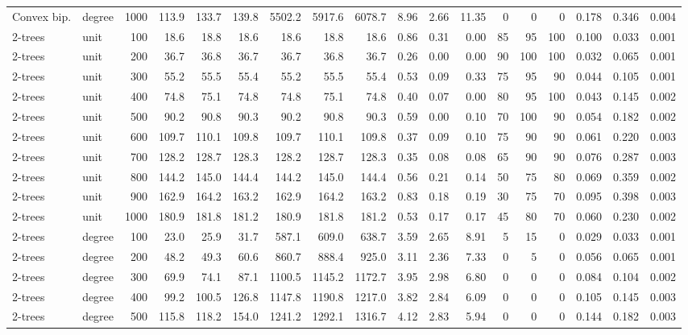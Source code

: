 \begin{tabular}{llr rrr rrr rrr rrr rrr}
Convex bip. & degree & 1000 & 113.9 & 133.7 & 139.8 & 5502.2 & 5917.6 & 6078.7 & 8.96 & 2.66 & 11.35 & 0 & 0 & 0 & 0.178 & 0.346 & 0.004 \\
2-trees & unit & 100 & 18.6 & 18.8 & 18.6 & 18.6 & 18.8 & 18.6 & 0.86 & 0.31 & 0.00 & 85 & 95 & 100 & 0.100 & 0.033 & 0.001 \\
2-trees & unit & 200 & 36.7 & 36.8 & 36.7 & 36.7 & 36.8 & 36.7 & 0.26 & 0.00 & 0.00 & 90 & 100 & 100 & 0.032 & 0.065 & 0.001 \\
2-trees & unit & 300 & 55.2 & 55.5 & 55.4 & 55.2 & 55.5 & 55.4 & 0.53 & 0.09 & 0.33 & 75 & 95 & 90 & 0.044 & 0.105 & 0.001 \\
2-trees & unit & 400 & 74.8 & 75.1 & 74.8 & 74.8 & 75.1 & 74.8 & 0.40 & 0.07 & 0.00 & 80 & 95 & 100 & 0.043 & 0.145 & 0.002 \\
2-trees & unit & 500 & 90.2 & 90.8 & 90.3 & 90.2 & 90.8 & 90.3 & 0.59 & 0.00 & 0.10 & 70 & 100 & 90 & 0.054 & 0.182 & 0.002 \\
2-trees & unit & 600 & 109.7 & 110.1 & 109.8 & 109.7 & 110.1 & 109.8 & 0.37 & 0.09 & 0.10 & 75 & 90 & 90 & 0.061 & 0.220 & 0.003 \\
2-trees & unit & 700 & 128.2 & 128.7 & 128.3 & 128.2 & 128.7 & 128.3 & 0.35 & 0.08 & 0.08 & 65 & 90 & 90 & 0.076 & 0.287 & 0.003 \\
2-trees & unit & 800 & 144.2 & 145.0 & 144.4 & 144.2 & 145.0 & 144.4 & 0.56 & 0.21 & 0.14 & 50 & 75 & 80 & 0.069 & 0.359 & 0.002 \\
2-trees & unit & 900 & 162.9 & 164.2 & 163.2 & 162.9 & 164.2 & 163.2 & 0.83 & 0.18 & 0.19 & 30 & 75 & 70 & 0.095 & 0.398 & 0.003 \\
2-trees & unit & 1000 & 180.9 & 181.8 & 181.2 & 180.9 & 181.8 & 181.2 & 0.53 & 0.17 & 0.17 & 45 & 80 & 70 & 0.060 & 0.230 & 0.002 \\
2-trees & degree & 100 & 23.0 & 25.9 & 31.7 & 587.1 & 609.0 & 638.7 & 3.59 & 2.65 & 8.91 & 5 & 15 & 0 & 0.029 & 0.033 & 0.001 \\
2-trees & degree & 200 & 48.2 & 49.3 & 60.6 & 860.7 & 888.4 & 925.0 & 3.11 & 2.36 & 7.33 & 0 & 5 & 0 & 0.056 & 0.065 & 0.001 \\
2-trees & degree & 300 & 69.9 & 74.1 & 87.1 & 1100.5 & 1145.2 & 1172.7 & 3.95 & 2.98 & 6.80 & 0 & 0 & 0 & 0.084 & 0.104 & 0.002 \\
2-trees & degree & 400 & 99.2 & 100.5 & 126.8 & 1147.8 & 1190.8 & 1217.0 & 3.82 & 2.84 & 6.09 & 0 & 0 & 0 & 0.105 & 0.145 & 0.003 \\
2-trees & degree & 500 & 115.8 & 118.2 & 154.0 & 1241.2 & 1292.1 & 1316.7 & 4.12 & 2.83 & 5.94 & 0 & 0 & 0 & 0.144 & 0.182 & 0.003 \\

\end{tabular}
